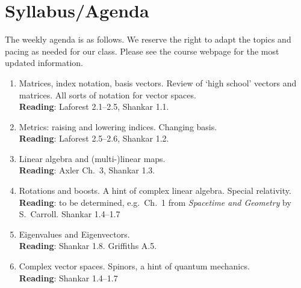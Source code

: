 \documentclass[12pt]{article}
\numberwithin{equation}{section}    %
\begin{document}
\section{Syllabus/Agenda}

The weekly agenda is as follows. 
We reserve the right to adapt the topics and pacing as needed for our class. Please see the course webpage for the most updated information.

\begin{enumerate}
	\item %
	Matrices, index notation, basis vectors. Review of `high school' vectors and matrices. All sorts of notation for vector spaces.
	\\
	\textsf{\small 
		\textbf{Reading}: Laforest 2.1--2.5, Shankar 1.1.
	}

	\item %
	Metrics: raising and lowering indices. Changing basis.
	\\
	\textsf{\small 
		\textbf{Reading}: Laforest 2.5--2.6, Shankar 1.2.
	}

	\item %
	Linear algebra and (multi-)linear maps.
	\\
	\textsf{\small 
		\textbf{Reading}: Axler Ch.~3, Shankar 1.3.
	}

	\item %
	Rotations and boosts. A hint of complex linear algebra. Special relativity.
	\\
	\textsf{\small 
		\textbf{Reading}: to be determined, e.g.~Ch.~1 from \emph{Spacetime and Geometry} by S.~Carroll. Shankar 1.4--1.7
	}

	\item %
	Eigenvalues and Eigenvectors.
	\\
	\textsf{\small 
		\textbf{Reading}: Shankar 1.8. Griffiths A.5.
	}

	\item %
	Complex vector spaces. Spinors, a hint of quantum mechanics.
	\\
	\textsf{\small 
		\textbf{Reading}: Shankar 1.4--1.7
	}


\end{enumerate}
\end{document}
